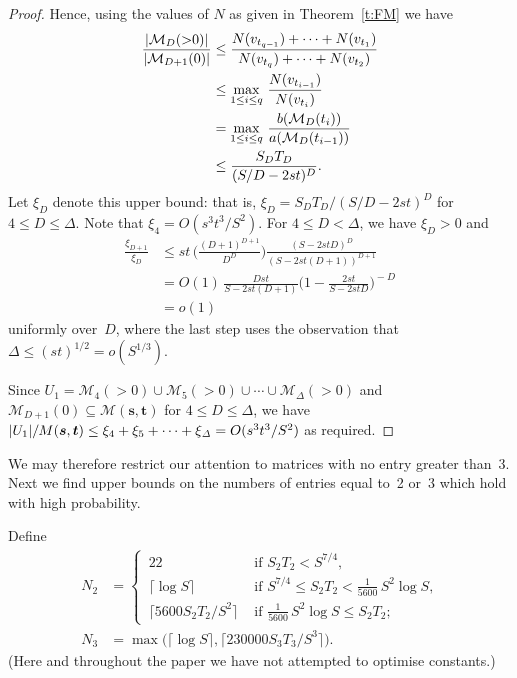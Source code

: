 \documentclass[12pt]{article}
\numberwithin{equation}{section}
\def\M{{\mathcal{M}}}
\def\({\bigl(}   \def\){\bigr)}
\def\svec{{\boldsymbol{s}}}
\def\tvec{{\boldsymbol{t}}}
\def\Deltait{{\mathit{\Delta}}}
\def\Mst{{\M(\svec,\tvec)}}
\begin{document}
\begin{proof}
Hence, using the values of $N$ as given in Theorem~\ref{t:FM} 
we have
\begin{align*}
 \frac{\card{\M_D({>}0)}}{\card{\M_{D+1}(0)}} &\leq
    \frac{N(v_{t_{q-1}}) + \cdots + N(v_{t_1})}
            {N(v_{t_q}) + \cdots + N(v_{t_2})} \\     
   &\leq \max_{1\leq i\leq q}\, \frac{N(v_{t_{i-1}})}{N(v_{t_i})} \\
   &= \max_{1\leq i\leq q}\, \frac{b(\M_D(t_i))}{a(\M_D(t_{i-1}))} \\
   &\leq \frac{S_DT_D}{(S/D-2st)^D}.
\end{align*}
Let $\xi_D$ denote this upper bound: that is,
$\xi_D=S_DT_D/(S/D-2st)^D$ for $4\leq D\leq\Deltait$.
Note that $\xi_4 = O(s^3t^3/S^2)$.  For 
$4\le D < \Deltait$, we have $\xi_D > 0$ and
\begin{align*}
\frac{\xi_{D+1}}{\xi_D} &\leq st\,\biggl(\frac{(D+1)^{D+1}}{D^D}\biggr)
               \frac{(S-2stD)^D}{(S-2st(D+1))^{D+1}} \\
       &= O(1)\, \frac{Dst}{S-2st(D+1)} 
          \biggl(1 - \frac{2st}{S-2stD}\biggr)^{\!\!-D} \\[0.5ex]
       &= o(1)
\end{align*}
uniformly over~$D$, where the last step uses the observation
that 
$\Deltait\le (st)^{1/2} = o(S^{1/3})$.

\medskip

Since $U_1=\M_4({>}0)\cup\M_5({>}0)\cup\cdots\cup\M_\Deltait({>}0)$
and $\M_{D+1}(0)\subseteq\Mst$ for $4\leq D\leq \Deltait$, 
we have $\card{U_1}/M(\svec,\tvec) 
\leq \xi_4 + \xi_5 + \cdots + \xi_\Deltait = O(s^3t^3/S^2)$
as required.
\end{proof}

\medskip
We may therefore restrict our attention to matrices with no
entry greater than~3.
Next we find upper bounds on the numbers of entries equal
to~2 or~3 which hold with high probability.

Define  
\begin{align*}
N_2 &= \begin{cases} 
    \,22 & \text{ if $S_2T_2 < S^{7/4}$,}\\[0.5ex]
\, \lceil \log  S \rceil & \text{ if $S^{7/4} \leq S_2T_2 < \tfrac{1}{5600} \, S^2\log S$,}\\[0.5ex] 
 \, \lceil 5600 S_2T_2/S^2\rceil & 
      \text{ if $\tfrac{1}{5600} \, S^2\log S\leq S_2 T_2$;} 
  \end{cases}\\[0.5ex]
N_3 &= \max\( \lceil \log  S \rceil, \lceil 230000 S_3T_3/S^3\rceil \).
\end{align*}
(Here and throughout the paper we have not attempted to optimise constants.)
\end{document}
